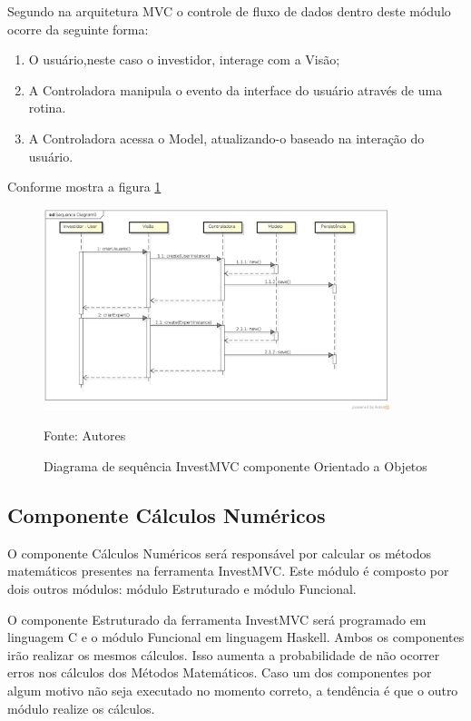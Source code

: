 Segundo  na arquitetura MVC o controle de fluxo de dados dentro deste módulo ocorre da seguinte forma:

\begin{enumerate}
\item O usuário,neste caso o investidor, interage com a Visão;
\item A Controladora manipula o evento da interface do usuário através de uma rotina.
\item A Controladora acessa o Model, atualizando-o baseado na interação do usuário.
\end{enumerate}

Conforme mostra a figura \ref{sequenciaOO}

\begin{figure}[htp]
\centering
\includegraphics[width=0.9\textwidth]{figuras/sequenciaOO}
\caption{Diagrama de sequência InvestMVC componente Orientado a Objetos}{Fonte: Autores}
\label{sequenciaOO}
\end{figure}

\subsection{Componente Cálculos Numéricos}

O componente Cálculos Numéricos será responsável por calcular os métodos matemáticos presentes na ferramenta InvestMVC. Este módulo é composto por dois outros módulos: módulo Estruturado e módulo Funcional.

O componente Estruturado da ferramenta InvestMVC será programado em linguagem C e o módulo Funcional em linguagem Haskell. Ambos os componentes irão realizar os mesmos cálculos. Isso aumenta a probabilidade de não ocorrer erros nos cálculos dos Métodos Matemáticos. Caso um dos componentes por algum motivo não seja executado no momento correto, a tendência é que o outro módulo realize os cálculos.

